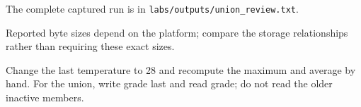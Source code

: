 The complete captured run is in \texttt{labs/outputs/union\_review.txt}.

Reported byte sizes depend on the platform; compare the storage relationships rather than requiring these exact sizes.

\begin{tryit}

Change the last temperature to 28 and recompute the maximum and average by hand. For the union, write grade last and read grade; do not read the older inactive members.

\end{tryit}
